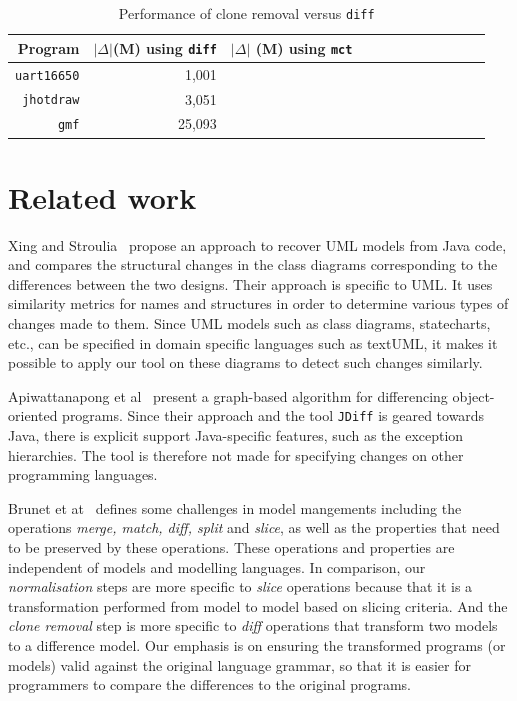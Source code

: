\documentclass[10pt, conference, compsocconf]{IEEEtran}
\begin{document}
{\begin{table}\centering
\caption{Performance of clone removal versus {\tt diff}\label{table:3}}
\begin{tabular}{| r || r | r || r | r | r || r| r|  r || r | r | r |}\hline
{\bf Program} & \footnotesize  $|\Delta|$(M) using {\tt diff} & \footnotesize $|\Delta|$ (M) using {\tt mct}  \\  \hline\hline
{\tt uart16650} & 1,001 &\\\hline
{\tt jhotdraw} & 3,051 &\\\hline
{\tt gmf} & 25,093 &\\\hline
\hline\end{tabular}
\end{table}


\section{Related work}\label{sec:related}
% 
Xing and Stroulia~\cite{xing05ase} propose an approach to recover UML models from Java code, and compares  the structural changes in the class diagrams corresponding to the differences between the two designs.  Their approach is specific to UML. It uses similarity metrics for names and structures in order to determine various types of changes made to them. Since UML models such as class diagrams, statecharts, etc., can be specified in domain specific languages such as textUML, it makes it possible to apply our tool on these diagrams to detect such changes similarly. 

Apiwattanapong et al~\cite{Apiwattanapong:2004:DAO:1025115.1025202} present a graph-based algorithm for differencing object-oriented programs. Since their approach and the tool {\tt JDiff} is geared towards Java, there is explicit support Java-specific features, such as the exception hierarchies. The tool is therefore not made for specifying changes on other programming languages. 

Brunet et at~\cite{brunet06gamma} defines some challenges in model mangements including the operations {\em merge, match, diff, split} and {\em slice}, as well as the properties that need to be preserved by these operations. These operations and properties are independent of models and modelling languages. In comparison, our {\em normalisation} steps are more specific to {\em slice} operations because that it is a transformation performed from model to model based on slicing criteria. And the {\em clone removal} step is more specific to {\em diff} operations that transform two models to a difference model. Our emphasis is on ensuring the transformed programs (or models) valid against the original language grammar, so that it is easier for programmers to compare the differences to the original programs.

}
\end{document}
